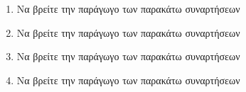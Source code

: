 \begin{enumerate}
\item Να βρείτε την παράγωγο των παρακάτω συναρτήσεων
\begin{multicols}{2}
\end{multicols}

\item Να βρείτε την παράγωγο των παρακάτω συναρτήσεων
\begin{multicols}{2}
\end{multicols}

\item Να βρείτε την παράγωγο των παρακάτω συναρτήσεων
\begin{multicols}{2}
\end{multicols}

\item Να βρείτε την παράγωγο των παρακάτω συναρτήσεων
\begin{multicols}{2}
\end{multicols}


\end{enumerate}
